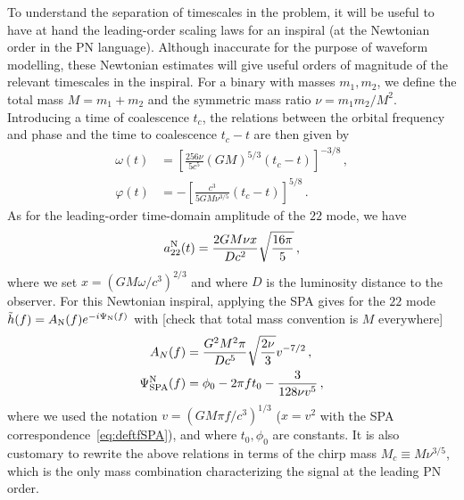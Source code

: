 \documentclass[aps,showpacs,twocolumn,
prd,superscriptaddress,nofootinbib]{revtex4-1}
\newcommand{\be}{\begin{equation}}
\newcommand{\ee}{\end{equation}}
\newcommand{\Mchirp}{M_{c}}
\newcommand{\SM}[1]{{\color{Red} #1}}
\begin{document}
To understand the separation of timescales in the problem, it will be useful to have at hand the leading-order scaling laws for an inspiral (at the Newtonian order in the PN language). Although inaccurate for the purpose of waveform modelling, these Newtonian estimates will give useful orders of magnitude of the relevant timescales in the inspiral. For a binary with masses $m_{1}, m_{2}$, we define the total mass $M=m_{1}+m_{2}$ and the symmetric mass ratio $\nu = m_{1}m_{2}/M^{2}$. Introducing a time of coalescence $t_{c}$, the relations between the orbital frequency and phase and the time to coalescence $t_{c} - t$ are then given by
\begin{subequations}\label{eq:omegaphiN}
\begin{align}
	\omega(t) &= \left[ \frac{256\nu}{5c^{5}} (GM)^{5/3} (t_{c}-t) \right]^{-3/8} \,, \\
	\varphi(t) &= -\left[ \frac{c^{3}}{5 G M \nu^{3/5}} (t_{c}-t) \right]^{5/8} \,.
\end{align}
\end{subequations}
As for the leading-order time-domain amplitude of the $22$ mode, we have~\cite{BlanchetLiving}
\be\label{eq:a22N}
	a_{22}^{\rm N} (t) = \frac{2 G M \nu x}{D c^{2}} \sqrt{\frac{16 \pi}{5}} \,,
\ee
where we set $x = (G M\omega/c^{3})^{2/3}$ and where $D$ is the luminosity distance to the observer. For this Newtonian inspiral, applying the SPA gives for the $22$ mode $\tilde{h}(f) = A_{\rm N}(f)e^{-i\Psi_{\rm N}(f)}$ with \SM{[check that total mass convention is $M$ everywhere]}
\begin{subequations}\label{eq:SPAN}
\begin{align}
	A_{N}(f) &= \frac{G^{2}M^{2} \pi}{Dc^{5}} \sqrt{\frac{2\nu}{3}} v^{-7/2}\,, \label{eq:ASPAN}\\
	\Psi_{\rm SPA}^{\rm N}(f) &= \phi_{0} - 2\pi f t_{0} - \frac{3}{128\nu v^{5}} \,, \label{eq:PsiSPAN} 
\end{align}
\end{subequations}
where we used the notation $v=(G M \pi f/c^{3})^{1/3}$ ($x=v^{2}$ with the SPA correspondence~\eqref{eq:deftfSPA}), and where $t_{0}, \phi_{0}$ are constants. It is also customary to rewrite the above relations in terms of the chirp mass $\Mchirp \equiv M\nu^{3/5}$, which is the only mass combination characterizing the signal at the leading PN order.
\end{document}
